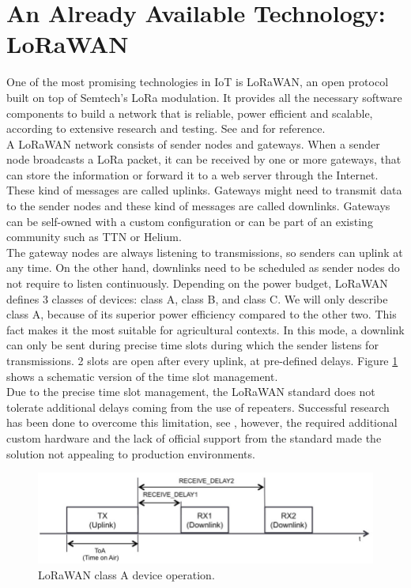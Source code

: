 \section{An Already Available Technology: LoRaWAN}
One of the most promising technologies in \gls{IoT} is \gls{LoRaWAN}, an open protocol built on top of
Semtech's LoRa modulation. It provides all the necessary software components to build a network
that is reliable, power efficient and scalable, according to extensive research and testing. See
\cite{lorawan_agriculture_1} and \cite{lorawan_agriculture_2} for reference.\\
A LoRaWAN network consists of sender nodes and gateways. When a sender node broadcasts a LoRa packet, it can be
received by one or more gateways, that can store the information or forward it to a web server through the Internet.
These kind of messages are called uplinks. Gateways might need to transmit data to the sender nodes and these kind of messages
are called downlinks. Gateways can be self-owned with a custom configuration or can be part of an existing community
such as \gls{TTN} or Helium.\\
The gateway nodes are always listening to transmissions, so senders can uplink at any time. On the other hand, downlinks
need to be scheduled as sender nodes do not require to listen continuously. Depending on the power budget,
LoRaWAN defines 3 classes of devices: class A, class B, and class C. We will only describe class A, because of
its superior power efficiency compared to the other two. This fact makes it the most suitable for agricultural contexts.
In this mode, a downlink can only be sent during precise time slots during which the sender listens for transmissions.
2 slots are open after every uplink, at pre-defined delays. Figure \ref{img: lorawan class a} shows a schematic version
of the time slot management.\\
Due to the precise time slot management, the LoRaWAN standard does not tolerate additional delays coming from the
use of repeaters. Successful research has been done to overcome this limitation, see \cite{lorawan_range_extender},
however, the required additional custom hardware and the lack of official support from the standard made the solution not
appealing to production environments.

\begin{figure}[ht]
    \centering
    \includegraphics[width=\linewidth]{images/lorawan_class_a.png}
    \caption{LoRaWAN class A device operation.}
    \label{img: lorawan class a}
\end{figure}

